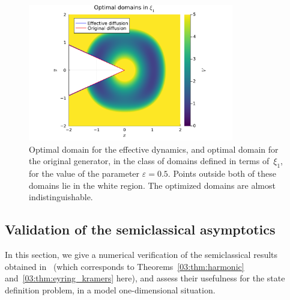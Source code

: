 \begin{figure}
    \centering
    \includegraphics[width=0.8\textwidth]{figures/03/2d/opt_domains2d.pdf}
    \caption[]{Optimal domain for the effective dynamics, and optimal domain for the original generator, in the class of domains defined in terms of~$\xi_1$, for the value of the parameter $\varepsilon=0.5$.  Points outside both of these domains lie in the white region. The optimized domains are almost indistinguishable.}
    \label{03:fig:opt_2D}
\end{figure}

\subsection{Validation of the semiclassical asymptotics}
\label{03:subsec:semiclassical_val}
In this section, we give a numerical verification of the semiclassical results obtained in~\cite{BLS25a} (which corresponds to Theorems~\ref{03:thm:harmonic} and~\ref{03:thm:eyring_kramers} here), and assess their usefulness for the state definition problem, in a model one-dimensional situation.
